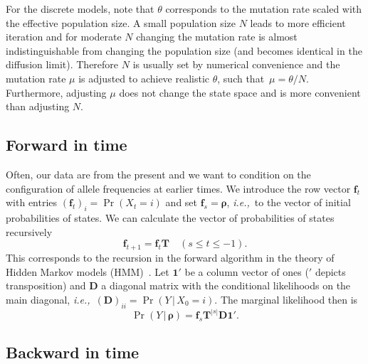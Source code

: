\documentclass[preprint]{elsarticle}
\newcommand{\bs}[1]{\ensuremath{\boldsymbol{#1}}}
\newcommand\given{{\,|\,}}
\newcommand\eg{{\it e.g.,}}
\newcommand\ie{{\it i.e.,}}
\newcommand\x[1]{\ensuremath{X_{#1}}}
\newcommand\y{\ensuremath{Y}}
\newcommand\s{\ensuremath{s}}
\newcommand\fv[1]{\ensuremath{\mathbf{f}_{#1}}}
\newcommand\oneC{\ensuremath{\mathbf{1}'}}
\begin{document}
For the discrete models, note that $\theta$ corresponds to the mutation rate scaled with the effective population size. A small population size $N$ leads to more efficient iteration and for moderate $N$ changing the mutation rate is almost indistinguishable from changing the population size (and becomes identical in the diffusion limit). Therefore $N$ is usually set by numerical convenience and the mutation rate $\mu$ is adjusted to achieve realistic $\theta$, such that $\mu=\theta/N$. Furthermore, adjusting $\mu$ does not change the state space and is more convenient than adjusting $N$.

\subsection{Forward in time}

Often, our data are from the present and we want to condition on the configuration of allele frequencies at earlier times.  We introduce the row vector $\fv{t}$ with entries $(\fv{t})_{i} = \Pr(X_{t} = i)$ and set $\fv{\s} = \bs{\rho}$, \ie\ to the vector of initial probabilities of states. We can calculate the vector of probabilities of states recursively 
\begin{equation}
\fv{t+1} = \fv{t}\mathbf{T} \quad (\s \le t \le -1).
\end{equation}
This corresponds to the recursion in the forward algorithm in the theory of Hidden Markov models (HMM)~\citep[\eg][]{Vogl10}. Let $\oneC$ be a column vector of ones ($'$ depicts transposition) and $\mathbf{D}$ a diagonal matrix with the conditional likelihoods on the main diagonal, \ie\ $(\mathbf{D})_{ii}=\Pr(\y \given \x{0}=i)$. The marginal likelihood then is
\begin{equation}
\Pr(\y \given \bs{\rho}) = \fv{\s}\mathbf{T}^{|\s|}\mathbf{D}\oneC.
\end{equation}

\subsection{Backward in time}\label{section:backward}
\end{document}
